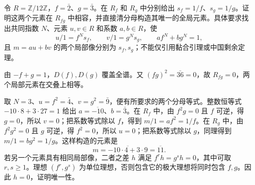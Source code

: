 \begin{exercise}\label{b3:ex:02-two-open-gluing-calculation}
	令 \(R=\mathbb Z/12\mathbb Z\)，\(f=\bar2\)、\(g=\bar3\)。在 \(R_f\) 和 \(R_g\) 中分别给出 \(s_f=1/f\)、\(s_g=1/g\)。证明这两个元素在 \(R_{fg}\) 中相容，并直接清分母构造其唯一的全局元素。具体要求找出共同指数 \(N\)、元素 \(u,v\in R\) 和系数 \(a,b\in R\)，使
	\[
		u/1=f^Ns_f,\qquad v/1=g^Ns_g, \qquad af^N+bg^N=1,
	\]
	且 \(m=au+bv\) 的两个局部像分别为 \(s_f,s_g\)；不能仅引用黏合引理或中国剩余定理。
\end{exercise}
\begin{solution}
	由 \(-f+g=1\)，\(D(f),D(g)\) 覆盖全谱。又 \((fg)^2=\bar{36}=0\)，故 \(R_{fg}=0\)，两个局部元素在交叠上相等。

	取 \(N=3\)、\(u=f^2=\bar4\)、\(v=g^2=\bar9\)，便有所要求的两个分母等式。整数恒等式 \(-10\cdot8+3\cdot27=1\) 给出 \(a=\overline{-10}\)、\(b=\bar3\)。在 \(R_f\) 中，由 \(f^2g=0\) 且 \(f\) 可逆，得 \(g=0\)，所以 \(v=0\)；把系数等式除以 \(f\)，得到 \(m/1=af^2=1/f\)。在 \(R_g\) 中，由 \(f^2g^2=0\) 且 \(g\) 可逆，得 \(f^2=0\)，所以 \(u=0\)；把系数等式除以 \(g\)，同理得到 \(m/1=bg^2=1/g\)。这样构造的元素是
	\[
		m=\overline{-10\cdot4+3\cdot9}=\overline{11}.
	\]
	若另一个元素具有相同局部像，二者之差 \(h\) 满足 \(f^rh=g^sh=0\)，其中可取 \(r,s\ge1\)。理想 \((f^r,g^s)\) 为单位理想，否则包含它的极大理想将同时包含 \(f,g\)。因此 \(h=0\)，证明唯一性。
\end{solution}

